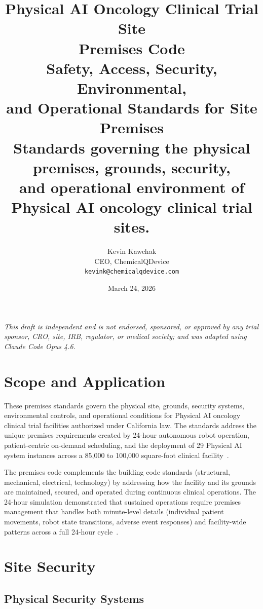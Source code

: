 \documentclass[11pt,letterpaper]{article}
\title{%
  \textbf{Physical AI Oncology Clinical Trial Site}\\
  \textbf{Premises Code}\\[6pt]
  \large Safety, Access, Security, Environmental,\\
  and Operational Standards for Site Premises\\[6pt]
  \normalsize Standards governing the physical premises, grounds, security,\\
  and operational environment of Physical AI oncology clinical trial sites.
}
\author{%
  Kevin Kawchak\\
  CEO, ChemicalQDevice\\
  \texttt{kevink@chemicalqdevice.com}
}
\date{March 24, 2026}
\begin{document}
\maketitle
\thispagestyle{fancy}

\begin{center}
\footnotesize
\textit{This draft is independent and is not endorsed, sponsored, or approved
by any trial sponsor, CRO, site, IRB, regulator, or medical society;
and was adapted using Claude Code Opus 4.6.}
\end{center}

\vspace{1em}
\tableofcontents
\newpage

\section{Scope and Application}

These premises standards govern the physical site, grounds, security systems,
environmental controls, and operational conditions for Physical AI oncology
clinical trial facilities authorized under California law. The standards address
the unique premises requirements created by 24-hour autonomous robot operation,
patient-centric on-demand scheduling, and the deployment of 29 Physical AI
system instances across a 85,000 to 100,000 square-foot clinical
facility~\cite{sitespec2026}.

The premises code complements the building code standards (structural,
mechanical, electrical, technology) by addressing how the facility and its
grounds are maintained, secured, and operated during continuous clinical
operations. The 24-hour simulation demonstrated that sustained operations
require premises management that handles both minute-level details (individual
patient movements, robot state transitions, adverse event responses) and
facility-wide patterns across a full 24-hour cycle~\cite{newtrial2026}.

\section{Site Security}

\subsection{Physical Security Systems}
\end{document}
